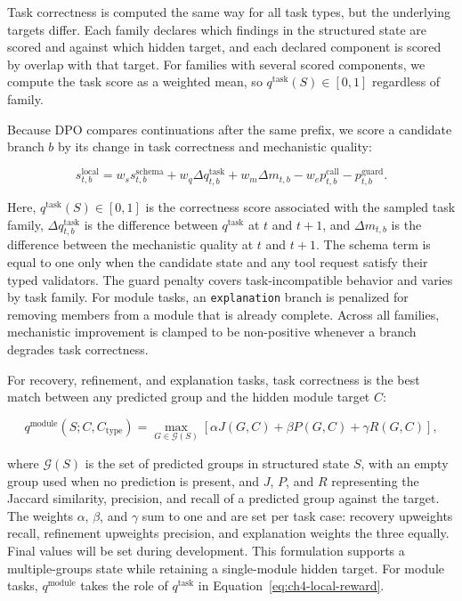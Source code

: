 Task correctness is computed the same way for all task types, but the underlying targets differ. Each family declares which findings in the structured state are scored and against which hidden target, and each declared component is scored by overlap with that target. For families with several scored components, we compute the task score as a weighted mean, so $q^{\mathrm{task}}(S) \in [0,1]$ regardless of family.

Because DPO compares continuations after the same prefix, we score a candidate branch $b$ by its change in task correctness and mechanistic quality:

\begin{equation}\label{eq:ch4-local-reward}
    s^{\mathrm{local}}_{t,b}
    = w_s s^{\mathrm{schema}}_{t,b}
    + w_q \Delta q^{\mathrm{task}}_{t,b}
    + w_m \Delta m_{t,b}
    - w_e p^{\mathrm{call}}_{t,b}
    - p^{\mathrm{guard}}_{t,b}.
\end{equation}

Here, $q^{\mathrm{task}}(S)\in[0,1]$ is the correctness score associated with the sampled task family, $\Delta q^{\mathrm{task}}_{t,b}$ is the difference between $q^{\mathrm{task}}$ at $t$ and $t+1$, and $\Delta m_{t,b}$ is the difference between the mechanistic quality at $t$ and $t+1$. The schema term is equal to one only when the candidate state and any tool request satisfy their typed validators. The guard penalty covers task-incompatible behavior and varies by task family. For module tasks, an \texttt{explanation} branch is penalized for removing members from a module that is already complete. Across all families, mechanistic improvement is clamped to be non-positive whenever a branch degrades task correctness.

For recovery, refinement, and explanation tasks, task correctness is the best match between any predicted group and the hidden module target $C$:

\begin{equation*}
    q^{\mathrm{module}}(S; C, C_{\mathrm{type}})
    = \max_{G \in \mathcal{G}(S)}
    \left[
        \alpha J(G,C)+\beta P(G,C)+\gamma R(G,C)
    \right],
\end{equation*}

where $\mathcal{G}(S)$ is the set of predicted groups in structured state $S$, with an empty group used when no prediction is present, and $J$, $P$, and $R$ representing the Jaccard similarity, precision, and recall of a predicted group against the target. The weights $\alpha$, $\beta$, and $\gamma$ sum to one and are set per task case: recovery upweights recall, refinement upweights precision, and explanation weights the three equally. Final values will be set during development. This formulation supports a multiple-groups state while retaining a single-module hidden target. For module tasks, $q^{\mathrm{module}}$ takes the role of $q^{\mathrm{task}}$ in Equation~\ref{eq:ch4-local-reward}.


